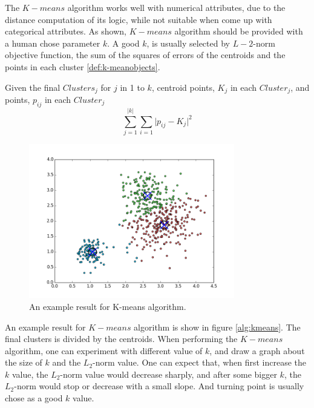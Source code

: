 \documentclass[utf8,english]{gradu3}
\begin{document}
The $K-means$ algorithm works well with numerical attributes, due to the distance computation of its logic, while not suitable when come up with categorical attributes. As shown, $K-means$ algorithm should be provided with a human chose parameter $k$. A good $k$, is usually selected by $L-2$-norm objective function, the sum of the squares of errors of the centroids and the points in each cluster \ref{def:k-meanobjects}.



\begin{definition}
	\label{def:k-meanobjects}
	Given the final $Clusters_j$ for $j$ in 1 to $k$, centroid points, $K_j$ in each $Cluster_j$, and points, $p_{ij}$ in each $Cluster_j$
	\[
		\sum\limits_{j=1}^{\lvert  k\rvert } \sum\limits_{i=1} \lvert p_{ij} - K_j \lvert ^2
	\]
\end{definition}

\begin{figure}
	\centering
	\includegraphics[width=0.80\textwidth]{pic/kmeans.png}
	\caption{An example result for K-means algorithm.}
	\label{fig:kmeans}
\end{figure}


An example result for $K-means$ algorithm is show in figure \ref{alg:kmeans}. The final clusters is divided by the centroids.
When performing the $K-means$ algorithm, one can experiment with different value of $k$, and draw a graph about the size of $k$ and the $L_2$-norm value. One can expect that, when first increase the $k$ value, the $L_2$-norm value would decrease sharply, and after some bigger $k$, the $L_2$-norm would stop or decrease with a small slope. And turning point is usually chose as a good $k$ value.
\end{document}
